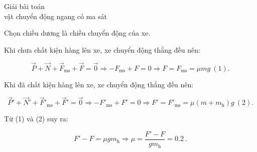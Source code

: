 \begin{dang}{Giải bài toán\\ vật chuyển động ngang có ma sát}
{		Chọn chiều dương là chiều chuyển động của xe.
		
		Khi chưa chất kiện hàng lên xe, xe chuyển động thằng đều nên:
		
		$$\vec P + \vec N + \vec F_\text{ms} + \vec F = \vec 0 \Rightarrow - F_\text{ms} + F =0 \Rightarrow F =F_\text{ms} = \mu mg\ (1).$$
		
		Khi đã chất kiện hàng lên xe, xe chuyển động thẳng đều nên:	
		
		$$\vec P' + \vec N' + \vec F'_\text{ms} + \vec F' = \vec 0 \Rightarrow - F'_\text{ms} + F' =0 \Rightarrow F' =F'_\text{ms} = \mu (m+m_\text{h})g\ (2).$$
		
		Từ (1) và (2) suy ra: 
		
		$$F' - F = \mu g m_\text{h} \Rightarrow \mu =\dfrac{F'-F}{gm_\text{h}} = \SI{0,2}{}.$$
		
		
	}
	
\end{dang}
